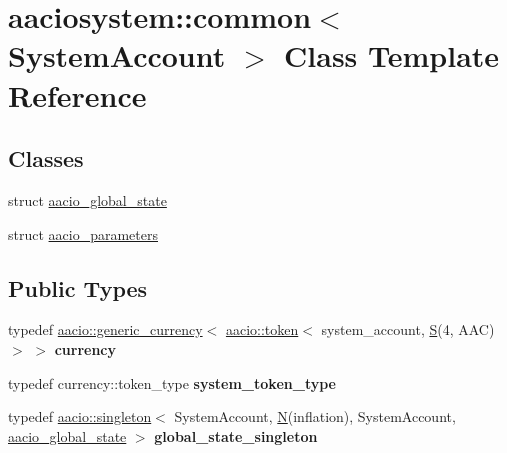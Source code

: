 \hypertarget{classaaciosystem_1_1common}{}\section{aaciosystem\+:\+:common$<$ System\+Account $>$ Class Template Reference}
\label{classaaciosystem_1_1common}
\subsection*{Classes}
\begin{DoxyCompactItemize}
\item 
struct \mbox{\hyperlink{structaaciosystem_1_1common_1_1aacio__global__state}{aacio\+\_\+global\+\_\+state}}
\item 
struct \mbox{\hyperlink{structaaciosystem_1_1common_1_1aacio__parameters}{aacio\+\_\+parameters}}
\end{DoxyCompactItemize}
\subsection*{Public Types}
\begin{DoxyCompactItemize}
\item 
\mbox{\label{classaaciosystem_1_1common_acae0c9a215400241991521ddf577bb47}} 
typedef \mbox{\hyperlink{classaacio_1_1generic__currency}{aacio\+::generic\+\_\+currency}}$<$ \mbox{\hyperlink{classaacio_1_1token}{aacio\+::token}}$<$ system\+\_\+account, \mbox{\hyperlink{struct_s}{S}}(4, A\+AC)$>$ $>$ {\bfseries currency}
\item 
\mbox{\label{classaaciosystem_1_1common_a6e4ae143fbe389a35da5e7f93b4b092c}} 
typedef currency\+::token\+\_\+type {\bfseries system\+\_\+token\+\_\+type}
\item 
\mbox{\label{classaaciosystem_1_1common_afa891a90a60b0f634969f333eaeb35af}} 
typedef \mbox{\hyperlink{classaacio_1_1singleton}{aacio\+::singleton}}$<$ System\+Account, \mbox{\hyperlink{group__types_gaf9c1edb0e0da55ec6ba09f32f6839529}{N}}(inflation), System\+Account, \mbox{\hyperlink{structaaciosystem_1_1common_1_1aacio__global__state}{aacio\+\_\+global\+\_\+state}} $>$ {\bfseries global\+\_\+state\+\_\+singleton}
\end{DoxyCompactItemize}
